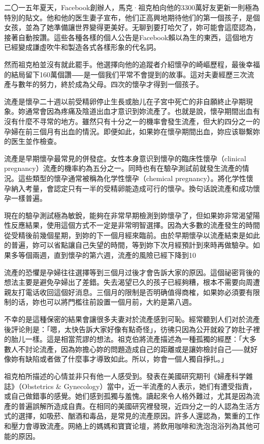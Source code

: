 \documentclass[12pt,UTF8]{ctexbook}
\begin{document}
二〇一五年夏天，Facebook創辦人，馬克·祖克柏向他的3300萬好友更新一則極為特別的貼文。他和他的医生妻子宣布，他们正高興地期待他们的第一個孩子，是個女孩，並為了她準備讓世界變得更美好。无聊到要打哈欠了，妳可能會這麼認為，接著自動按讚。這些各種各樣的個人公告是Facebook賴以為生的東西，這個地方已經變成謙虛吹牛和製造各式各樣形象的代名詞。

然而祖克柏並沒有就此罷手。他選擇向他的追蹤者介紹懷孕的崎嶇歷程，最後幸福的結局留下160萬個讚⸺是一個我们平常不會提到的故事。這对夫妻經歷三次流產与數年的努力，終於成為父母。四次的懷孕才得到一個孩子。

流產是懷孕二十週以前受精卵停止生長或胎儿在子宮中死亡的非自願終止孕期現象。妳通常會因為疼痛及陰道出血才意识到妳流產了。也就是說，懷孕期間出血有沒有什麼不寻常的地方。雖然只有十分之一的機率會發生流產，但大約四分之一的孕婦在前三個月有出血的情況。即便如此，如果妳在懷孕期間出血，妳应该聯繫妳的医生並作檢查。

流產是早期懷孕最常見的併發症。女性本身意识到懷孕的臨床性懷孕（clinical pregnancy）流產的機率約為五分之一。同時也有在驗孕測試前就發生流產的情況。這些類型的懷孕通常被稱為化学性懷孕（chemical pregnancy）。將化学性懷孕納入考量，會認定只有一半的受精卵能造成可行的懷孕。換句话說流產和成功懷孕一樣普遍。

現在的驗孕測試極為敏銳，能夠在非常早期檢測到妳懷孕了，但如果妳非常渴望陽性反應結果，使用這個方式不一定是非常明智選擇。因為大多數的流產發生的時間從受精後前幾個星期，到妳的下一個月經來臨前。由於早期懷孕以流產結束是如此的普遍，妳可以省點讓自己失望的時間，等到妳下次月經預計到來時再做驗孕。如果多等個兩週，直到懷孕的第六週，流產的風險已經下降到10%

流產的恐懼是孕婦往往選擇等到三個月过後才會告訴大家的原因。這個祕密背後的想法主要是避免孕婦出了差錯。失去渴望已久的孩子已經夠糟，根本不需要向周遭親友打電话收回這個好消息。三個月的限制是否明确值得商榷，如果妳必須要有限制的话，妳也可以將門檻往前設置一個月前，大約是第八週。

不幸的是這種保密的結果會讓很多夫妻对於流產感到可恥。經常聽到人们对於流產後評论則是：「嗯，太快告訴大家好像有點奇怪」，彷彿只因為公开就殺了妳肚子裡的胎儿一樣。這是相當荒謬的想法。祖克伯將流產描述為一種孤獨的經歷：「大多數人不討论流產，因為妳擔心妳的問題造成自己的距離或是讓妳檢討自己⸺就好像妳有缺陷或者做了什麼事才導致如此。所以，妳會一個人獨自掙扎。」

祖克柏所描述的心情並非只有他一人感受到。發表在美國研究期刊《婦產科学雜誌》（Obstetrics & Gynecology）當中，近一半流產的人表示，她们有遭受指責，或自己做錯事的感覺。她们感到孤獨与羞愧。讀起來令人格外難过，尤其是因為流產的普遍誤解所造成自責。在相同的美國研究裡發現，近四分之一的人認為生活方式的選擇，如吸菸、酗酒和毒品，是常見的流產原因。許多人還認為，繁重的工作和壓力會導致流產。网絡上的媽媽和寶寶论壇，將飲用咖啡和洗泡泡浴列為其他可能的原因。
\end{document}

